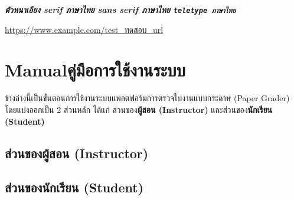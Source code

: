 \textbf{\textit{ตัวหนาเอียง serif ภาษาไทย \textsf{sans serif ภาษาไทย} \texttt{teletype ภาษาไทย}}}

\url{https://www.example.com/test_ทดสอบ_url}

\chapter{\ifenglish Manual\else คู่มือการใช้งานระบบ\fi}
  \qquad ข้างล่างนี้เป็นขั้นตอนการใช้งานระบบแพลตฟอร์มการตรวจใบงานแบบกระดาษ (Paper Grader) โดยแบ่งออกเป็น 2 ส่วนหลัก
  ได้แก่ ส่วนของ\textbf{ผู้สอน (Instructor)} และส่วนของ\textbf{นักเรียน (Student)}
  
\section{ส่วนของผู้สอน (Instructor)}
\section{ส่วนของนักเรียน (Student)}
